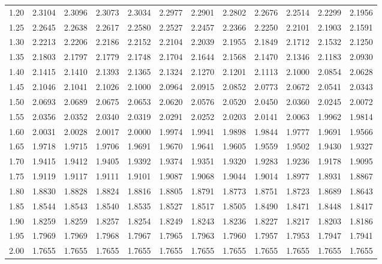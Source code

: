 \begin{tabular}{cccccccccccc}
1.20 & 2.3104 & 2.3096 & 2.3073 & 2.3034 & 2.2977 & 2.2901 & 2.2802 & 2.2676 & 2.2514 & 2.2299 & 2.1956 \\
1.25 & 2.2645 & 2.2638 & 2.2617 & 2.2580 & 2.2527 & 2.2457 & 2.2366 & 2.2250 & 2.2101 & 2.1903 & 2.1591 \\
1.30 & 2.2213 & 2.2206 & 2.2186 & 2.2152 & 2.2104 & 2.2039 & 2.1955 & 2.1849 & 2.1712 & 2.1532 & 2.1250 \\
1.35 & 2.1803 & 2.1797 & 2.1779 & 2.1748 & 2.1704 & 2.1644 & 2.1568 & 2.1470 & 2.1346 & 2.1183 & 2.0930 \\
1.40 & 2.1415 & 2.1410 & 2.1393 & 2.1365 & 2.1324 & 2.1270 & 2.1201 & 2.1113 & 2.1000 & 2.0854 & 2.0628 \\
1.45 & 2.1046 & 2.1041 & 2.1026 & 2.1000 & 2.0964 & 2.0915 & 2.0852 & 2.0773 & 2.0672 & 2.0541 & 2.0343 \\
1.50 & 2.0693 & 2.0689 & 2.0675 & 2.0653 & 2.0620 & 2.0576 & 2.0520 & 2.0450 & 2.0360 & 2.0245 & 2.0072 \\
1.55 & 2.0356 & 2.0352 & 2.0340 & 2.0319 & 2.0291 & 2.0252 & 2.0203 & 2.0141 & 2.0063 & 1.9962 & 1.9814 \\
1.60 & 2.0031 & 2.0028 & 2.0017 & 2.0000 & 1.9974 & 1.9941 & 1.9898 & 1.9844 & 1.9777 & 1.9691 & 1.9566 \\
1.65 & 1.9718 & 1.9715 & 1.9706 & 1.9691 & 1.9670 & 1.9641 & 1.9605 & 1.9559 & 1.9502 & 1.9430 & 1.9327 \\
1.70 & 1.9415 & 1.9412 & 1.9405 & 1.9392 & 1.9374 & 1.9351 & 1.9320 & 1.9283 & 1.9236 & 1.9178 & 1.9095 \\
1.75 & 1.9119 & 1.9117 & 1.9111 & 1.9101 & 1.9087 & 1.9068 & 1.9044 & 1.9014 & 1.8977 & 1.8931 & 1.8867 \\
1.80 & 1.8830 & 1.8828 & 1.8824 & 1.8816 & 1.8805 & 1.8791 & 1.8773 & 1.8751 & 1.8723 & 1.8689 & 1.8643 \\
1.85 & 1.8544 & 1.8543 & 1.8540 & 1.8535 & 1.8527 & 1.8517 & 1.8505 & 1.8490 & 1.8471 & 1.8448 & 1.8417 \\
1.90 & 1.8259 & 1.8259 & 1.8257 & 1.8254 & 1.8249 & 1.8243 & 1.8236 & 1.8227 & 1.8217 & 1.8203 & 1.8186 \\
1.95 & 1.7969 & 1.7969 & 1.7968 & 1.7967 & 1.7965 & 1.7963 & 1.7960 & 1.7957 & 1.7953 & 1.7947 & 1.7941 \\
2.00 & 1.7655 & 1.7655 & 1.7655 & 1.7655 & 1.7655 & 1.7655 & 1.7655 & 1.7655 & 1.7655 & 1.7655 & 1.7655 \\
\bottomrule
\end{tabular}
